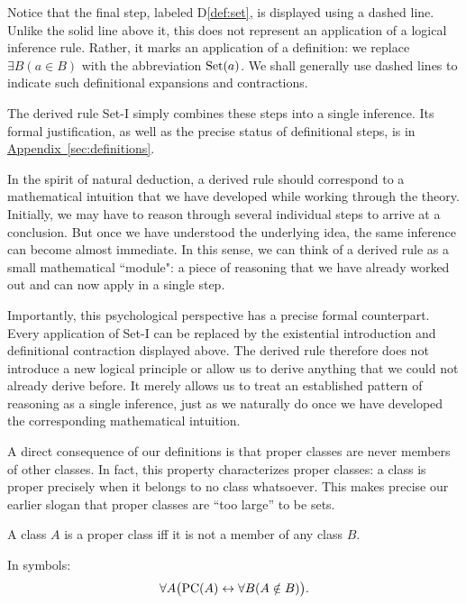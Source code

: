 Notice that the final step, labeled D\ref{def:set}, is displayed using a dashed line. Unlike the solid line above it, this does not represent an application of a logical inference rule. Rather, it marks an application of a definition: we replace $\exists B(a\in B)$ with the abbreviation $\operatorname{Set}(a)$. We shall generally use dashed lines to indicate such definitional expansions and contractions.

The derived rule Set-I simply combines these steps into a single inference. Its formal justification, as well as the precise status of definitional steps, is in \underline{\hyperref[sec:definitions]{Appendix~\ref*{sec:definitions}}}.


In the spirit of natural deduction, a derived rule should correspond to a mathematical intuition that we have developed while working through the theory. Initially, we may have to reason through several individual steps to arrive at a conclusion. But once we have understood the underlying idea, the same inference can become almost immediate. In this sense, we can think of a derived rule as a small mathematical ``module": a piece of reasoning that we have already worked out and can now apply in a single step.

Importantly, this psychological perspective has a precise formal counterpart. Every application of Set-I can be replaced by
the existential introduction and definitional
contraction displayed above. The derived rule therefore does not introduce a new logical principle or allow us to derive anything that we could not already derive before. It merely allows us to treat an established pattern of reasoning as a single inference, just as we naturally do once we have developed the corresponding mathematical intuition.


A direct consequence of our definitions is that proper
classes are never members of other classes. In fact, this
property characterizes proper classes: a class is proper
precisely when it belongs to no class whatsoever. This
makes precise our earlier slogan that proper classes
are ``too large'' to be sets.









\begin{proposition}
\label{prop:proper-classes-are-never-members}
    A class \(A\) is a proper class iff it is not
    a member of any class \(B\).

    In symbols:
    \[
        \forall A
        \bigl(
            \operatorname{PC}(A)\leftrightarrow
            \forall B(A\notin B)
        \bigr).
    \]
\end{proposition}

